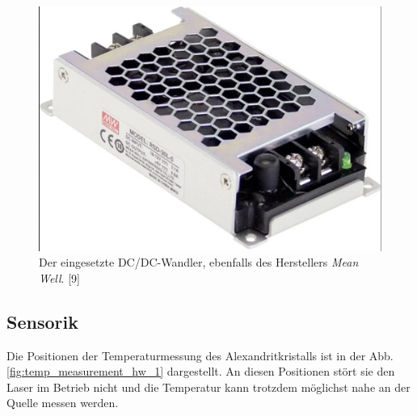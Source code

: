 \begin{figure}[H]
    \centering
    \includegraphics[scale=0.2, trim={2mm 2mm 2mm 2mm}, clip]{98_images/mean_well_dc_dc_converter.PNG}  
    \caption{Der eingesetzte DC/DC-Wandler, ebenfalls des Herstellers \textit{Mean Well}. [9]}
    \label{fig:dc_dc_wandler_hw}
\end{figure}

\subsection{Sensorik}
Die Positionen der Temperaturmessung des Alexandritkristalls ist in der Abb.\ref{fig:temp_measurement_hw_1} dargestellt. An diesen Positionen stört sie den Laser im Betrieb nicht und die Temperatur kann trotzdem möglichst nahe an der Quelle messen werden.\\


